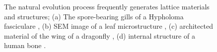 \begin{figure}
    \hfill
    \bigskip
    \hfill
    \caption{The natural evolution process frequently generates lattice materials and structures; (a) The spore-bearing gills of a Hypholoma fasciculare \cite{nz_hypholoma_2023}, (b) SEM image of a leaf microstructure \cite{library_leaf_nodate}, (c) architected material of the wing of a dragonfly \cite{gripspix_mostly_off_health_issues_wing_2007}, (d) internal structure of a human bone \cite{noauthor_bone_03_nodate}.}
    \label{fig:02_nature}
\end{figure}

